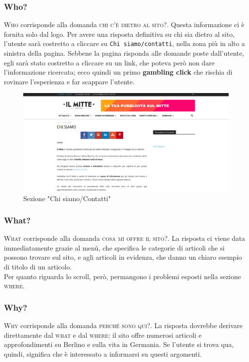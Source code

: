 \newpage

\subsubsection{Who?}
\textsc{Who} corrisponde alla domanda \textsc{chi c'è dietro al sito?}. Questa informazione ci è fornita solo dal logo. Per avere una risposta definitiva su chi sia dietro al sito, l'utente sarà costretto a cliccare su \texttt{Chi siamo/contatti}, nella zona più in alto a sinistra della pagina. Sebbene la pagina risponda alle domande poste dall'utente, egli sarà stato costretto a cliccare su un link, che poteva però non dare l'informazione ricercata; ecco quindi un primo \textbf{gambling click} che rischia di rovinare l'esperienza e far scappare l'utente.

\vspace{30pt}
\begin{figure}[htbp]
\begin{center}
\includegraphics[width=35em]{img/chisiamo}
\caption{Sezione "Chi siamo/Contatti"}
\end{center}
\end{figure}
\vspace{30pt}

\subsubsection{What?}
\textsc{What} corrisponde alla domanda \textsc{cosa mi offre il sito?}. La risposta ci viene data immediatamente grazie al menù, che specifica le categorie di articoli che si possono trovare sul sito, e agli articoli in evidenza, che danno un chiaro esempio di titolo di un articolo. \\
Per quanto riguarda lo scroll, però, permangono i problemi esposti nella sezione \textsc{where}.

\subsubsection{Why?}
\textsc{Why} corrisponde alla domanda \textsc{perché sono qui?}. La risposta dovrebbe derivare direttamente dal \textsc{what} e dal \textsc{where}: il sito offre numerosi articoli e approfondimenti su Berlino e sulla vita in Germania. Se l'utente si trova qua, quindi, significa che è interessato a informarsi su questi argomenti.

